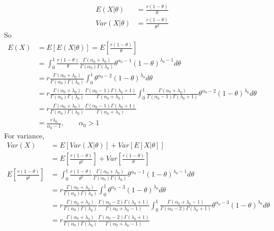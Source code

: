 \documentclass[11pt]{article} %
\begin{document}
\begin{itemize}
	\begin{align*}
		E(X|\theta) &= \frac{r(1-\theta)}{\theta} \\
		Var(X|\theta) &=  \frac{r(1-\theta)}{\theta^2} 
	\end{align*}
So
\begin{align*}
	E(X) &= E[E(X|\theta)] = E[\frac{r(1-\theta)}{\theta} ]\\
	&= \int_{0}^{1} \frac{r(1-\theta)}{\theta} \frac{\Gamma(\alpha_0 + \lambda_0)}{\Gamma(\alpha_0) \Gamma(\lambda_0)} \theta^{\alpha_0-1} (1-\theta)^{\lambda_0 -1} d\theta \\
	&=  r \frac{\Gamma(\alpha_0 + \lambda_0)}{\Gamma(\alpha_0) \Gamma(\lambda_0)}  \int_{0}^{1}  \theta^{\alpha_0-2} (1-\theta)^{\lambda_0} d\theta \\
	&= r \frac{\Gamma(\alpha_0 + \lambda_0)}{\Gamma(\alpha_0) \Gamma(\lambda_0)} \frac{\Gamma(\alpha_0 -1) \Gamma(\lambda_0+1) }{\Gamma(\alpha_0 + \lambda_0)} \int_{0}^{1} \frac{\Gamma(\alpha_0 + \lambda_0)}{\Gamma(\alpha_0-1) \Gamma(\lambda_0 +1)}  \theta^{\alpha_0-2} (1-\theta)^{\lambda_0} d\theta \\
	&= r \frac{\Gamma(\alpha_0 + \lambda_0)}{\Gamma(\alpha_0) \Gamma(\lambda_0)} \frac{\Gamma(\alpha_0 -1) \Gamma(\lambda_0+1) }{\Gamma(\alpha_0 + \lambda_0)} \\
	&= \frac{r \lambda_0}{\alpha_0 -1} , \qquad \alpha_0 > 1
\end{align*}
For variance,
\begin{align*}
	Var(X) &= E[Var(X|\theta)] + Var[E[X|\theta]]  \\
	&= E[\frac{r(1-\theta)}{\theta^2} ] + Var[\frac{r(1-\theta)}{\theta} ]\\
	E[\frac{r(1-\theta)}{\theta^2} ] 
	&= \int_{0}^{1} \frac{r(1-\theta)}{\theta^2} \frac{\Gamma(\alpha_0 + \lambda_0)}{\Gamma(\alpha_0) \Gamma(\lambda_0)} \theta^{\alpha_0-1} (1-\theta)^{\lambda_0 -1} d\theta \\
	&=  r \frac{\Gamma(\alpha_0 + \lambda_0)}{\Gamma(\alpha_0) \Gamma(\lambda_0)}  \int_{0}^{1}  \theta^{\alpha_0-3} (1-\theta)^{\lambda_0} d\theta \\
	&= r \frac{\Gamma(\alpha_0 + \lambda_0)}{\Gamma(\alpha_0) \Gamma(\lambda_0)} \frac{\Gamma(\alpha_0 -2) \Gamma(\lambda_0+1) }{\Gamma(\alpha_0 + \lambda_0 -1)} \int_{0}^{1} \frac{\Gamma(\alpha_0 + \lambda_0-1)}{\Gamma(\alpha_0-2) \Gamma(\lambda_0 +1)}  \theta^{\alpha_0-3} (1-\theta)^{\lambda_0} d\theta \\
	&= r \frac{\Gamma(\alpha_0 + \lambda_0)}{\Gamma(\alpha_0) \Gamma(\lambda_0)} \frac{\Gamma(\alpha_0 -2) \Gamma(\lambda_0+1) }{\Gamma(\alpha_0 + \lambda_0-1)} \\

\end{align*}
\end{itemize}
\end{document}
